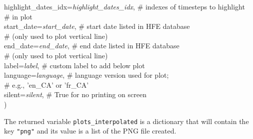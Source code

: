 \documentclass[10pt,a4paper,titlepage,parskip]{scrartcl}
\newenvironment{ttfont}{\fontfamily{\ttdefault}\selectfont}{\par}
\newcommand{\GRAU}[1]{\textcolor{ufzgray2}{#1}}
\begin{document}
\begin{framed}
\begin{ttfont}
\begin{tabbing}
			\> highlight\_dates\_idx=\textit{highlight\_dates\_idx}, \> \GRAU{\# indexes of timesteps to highlight}\\
			\> \> \GRAU{\# in plot}\\
			\> start\_date=\textit{start\_date}, \> \GRAU{\# start date listed in HFE database}\\
			\> \> \GRAU{\# (only used to plot vertical line)}\\
			\> end\_date=\textit{end\_date}, \> \GRAU{\# end date listed in HFE database}\\
			\> \> \GRAU{\# (only used to plot vertical line)}\\
			\> label=\textit{label}, \> \GRAU{\# custom label to add below plot}\\
			\> language=\textit{language}, \> \GRAU{\# language version used for plot; }\\
			\> \> \GRAU{\# e.g., 'en\_CA' or 'fr\_CA'}\\
			\> silent=\textit{silent}, \> \GRAU{\# True for no printing on screen}\\
			\> ) \> 
		\end{tabbing}
	\end{ttfont}
	\vspace*{-0.3cm}
\end{framed}
\vspace*{-0.3cm}
The returned variable \texttt{plots\_interpolated} is a dictionary that will contain the key \texttt{"png"} and its value is a list of the PNG file created. 
\end{document}
